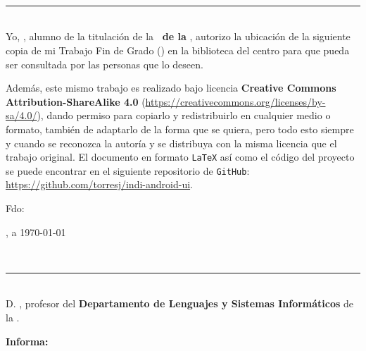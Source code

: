 \begin{center}
{\LARGE\bfseries\titulo}\\
\end{center}
\begin{center}
\autor\
\end{center}

\newpage
\thispagestyle{empty}
\
\vspace{3cm}

\noindent\rule[-1ex]{\textwidth}{2pt}\\[4.5ex]

Yo, \textbf{\autor}, alumno de la titulación \textbf{\grado} de la \textbf{\escuela\ de la \universidad}, autorizo la ubicación de la siguiente copia de mi Trabajo Fin de Grado (\textit{\titulo}) en la biblioteca del centro para que pueda ser consultada por las personas que lo deseen.

\bigskip
Además, este mismo trabajo es realizado bajo licencia \textbf{Creative Commons Attribution-ShareAlike 4.0} (\url{https://creativecommons.org/licenses/by-sa/4.0/}), dando permiso para copiarlo y redistribuirlo en cualquier medio o formato, también de adaptarlo de la forma que se quiera, pero todo esto siempre y cuando se reconozca la autoría y se distribuya con la misma licencia que el trabajo original. El documento en formato {\tt LaTeX} así como el código del proyecto se puede encontrar en el siguiente repositorio de {\tt GitHub}: \url{https://github.com/torresj/indi-android-ui}.

\vspace{4cm}

\noindent Fdo: \autor

\vspace{2cm}

\begin{flushright}
\ciudad, a \today
\end{flushright}

\newpage
\thispagestyle{empty}
\
\vspace{3cm}

\noindent\rule[-1ex]{\textwidth}{2pt}\\[4.5ex]

D. \textbf{\tutor}, profesor del \textbf{Departamento de Lenguajes y Sistemas Informáticos} de la \textbf{\universidad}.

\vspace{0.5cm}

\vspace{0.5cm}

\textbf{Informa:}


